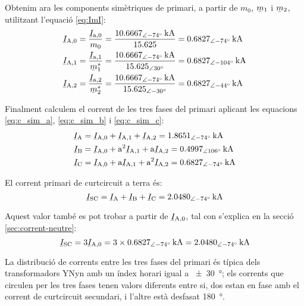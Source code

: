 \begin{exemple}
    Obtenim ara les components simètriques de primari, a partir de $m_0$, $\cmplx{m}_1$ i $\cmplx{m}_2$, utilitzant l'equació \eqref{eq:ImI}:
    \begin{align*}
        \cmplx{I}\ped{A,0} &= \frac{\cmplx{I}\ped{a,0}}{m_0} = \frac{\SIpd{10,6667}{-74}{kA}}{\num{15,625}} =  \SIpd{0,6827}{-74}{kA}\\
        \cmplx{I}\ped{A,1} &= \frac{\cmplx{I}\ped{a,1}}{\cmplx{m}^*_1} = \frac{\SIpd{10,6667}{-74}{kA}}{\numpd{15,625}{30}} =  \SIpd{0,6827}{-104}{kA} \\
        \cmplx{I}\ped{A,2} &= \frac{\cmplx{I}\ped{a,2}}{\cmplx{m}^*_2} = \frac{\SIpd{10,6667}{-74}{kA}}{\numpd{15,625}{-30}} = \SIpd{0,6827}{-44}{kA}
    \end{align*}

    Finalment calculem el corrent de les tres fases del primari aplicant les equacions \eqref{eq:c_sim_a}, \eqref{eq:c_sim_b} i \eqref{eq:c_sim_c}:
     \begin{align*}
        \cmplx{I}\ped{A} &= \cmplx{I}\ped{A,0} + \cmplx{I}\ped{A,1} + \cmplx{I}\ped{A,2} = \SIpd{1,8651}{-74}{kA} \\
        \cmplx{I}\ped{B} &= \cmplx{I}\ped{A,0} + \au^2 \cmplx{I}\ped{A,1} + \au \cmplx{I}\ped{A,2} = \SIpd{0,4997}{106}{kA} \\
        \cmplx{I}\ped{C} &= \cmplx{I}\ped{A,0} + \au \cmplx{I}\ped{A,1} + \au^2 \cmplx{I}\ped{A,2} = \SIpd{0,6827}{-74}{kA}
    \end{align*}

    El corrent primari de curtcircuit a terra és:
    \[
        \cmplx{I}\ped{SC} = \cmplx{I}\ped{A} + \cmplx{I}\ped{B} + \cmplx{I}\ped{C} = \SIpd{2,0480}{-74}{kA}
    \]

    Aquest valor també es pot trobar a partir de $\cmplx{I}\ped{A,0}$, tal con s'explica en la secció \vref{sec:corrent-neutre}:
       \[
        \cmplx{I}\ped{SC} = 3 \cmplx{I}\ped{A,0} = 3 \times \SIpd{0,6827}{-74}{kA} = \SIpd{2,0480}{-74}{kA}
    \]

    La distribució de corrents entre les tres fases del primari és típica dels transformadors YNyn amb un índex horari igual a \SI{+-30}{\degree}; els corrents que circulen per les tres fases tenen valors diferents entre si, dos estan en fase amb el corrent de curtcircuit secundari, i l'altre està desfasat \SI{180}{\degree}.


\end{exemple}

